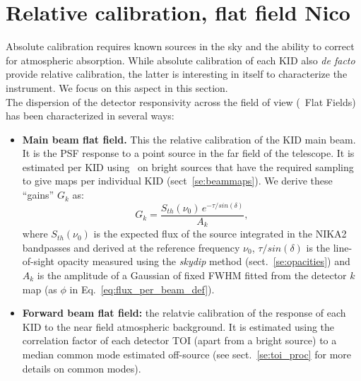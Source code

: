 

\section{Relative calibration, flat field {\color{YellowGreen} Nico}}
\label{se:flatfields}

Absolute calibration requires known sources in the sky and the ability to
correct for atmospheric absorption. While absolute calibration of each KID also
\emph{de facto} provide relative calibration, the latter is interesting in
itself to characterize the instrument. We focus on this aspect in this section.\\

The dispersion of the detector responsivity across the field of view (\aka\ Flat
Fields) has been characterized in several ways:

\begin{itemize}
\item {\bf Main beam flat field.} This the relative calibration of the KID main
  beam. It is the PSF response to a point source in the far field of the
  telescope. It is estimated per KID using \bms\ on bright sources that have the
  required sampling to give maps per individual KID (sect~\ref{se:beammaps}). We
  derive these ``gains'' $G_k$ as:
  \begin{equation}
    G_k = \frac{S_{th}(\nu_0)\, e^{-\tau/sin(\delta)}}{A_k}, 
  \end{equation}
  where $S_{th}(\nu_0)$ is the expected flux of the source integrated in the
  NIKA2 bandpasses and derived at the reference frequency $\nu_0$, 
  $\tau/sin(\delta)$ is the line-of-sight opacity measured using the
  \emph{skydip} method (sect.~\ref{se:opacities}) and $A_k$ is the
  amplitude of a Gaussian of fixed FWHM fitted from the detector $k$ map (as
  $\phi$ in Eq.~\ref{eq:flux_per_beam_def}).
\item {\bf Forward beam flat field:} the relatvie calibration of the response of
  each KID to the near field atmospheric background. It is estimated
  using the correlation factor of each detector TOI (apart from a bright source)
  to a median common mode estimated off-source (see sect.~\ref{se:toi_proc} for
  more details on common modes).
\end{itemize}


